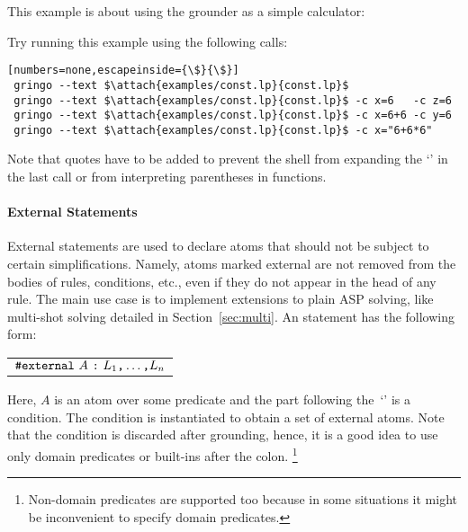 \begin{example}
This example is about using the grounder as a simple calculator:
%

%
Try running this example using the following calls:
\begin{lstlisting}[numbers=none,escapeinside={\$}{\$}]
 gringo --text $\attach{examples/const.lp}{const.lp}$
 gringo --text $\attach{examples/const.lp}{const.lp}$ -c x=6   -c z=6
 gringo --text $\attach{examples/const.lp}{const.lp}$ -c x=6+6 -c y=6
 gringo --text $\attach{examples/const.lp}{const.lp}$ -c x="6+6*6"
\end{lstlisting}
Note that quotes have to be added to prevent the shell from expanding the `\code{*}' in the last call
or from interpreting parentheses in functions.
\end{example}

\paragraph{External Statements}
%
External statements are used to declare atoms
that should not be subject to certain simplifications.
Namely,
atoms marked external are not removed from the bodies of rules, conditions, etc.,
even if they do not appear in the head of any rule.
The main use case is to implement extensions to plain ASP solving,
like multi-shot solving detailed in Section~\ref{sec:multi}.
An  statement has the following form:
%
\par
\medskip
\begin{tabular}{l}
$\texttt{\#external}~A~\texttt{:}~L_1\text{\texttt{,}}\dots\text{\texttt{,}}L_n$\code{.}
\end{tabular}
\par
\medskip
\noindent
%
Here, $A$ is an atom over some predicate and
the part following the~`\code{:}' is a condition.
The condition is instantiated to obtain a set of external atoms.
Note that the condition is discarded after grounding,
hence, it is a good idea to use only domain predicates or built-ins after the colon.%
\footnote{Non-domain predicates are supported too
because in some situations it might be inconvenient to specify domain predicates.}

